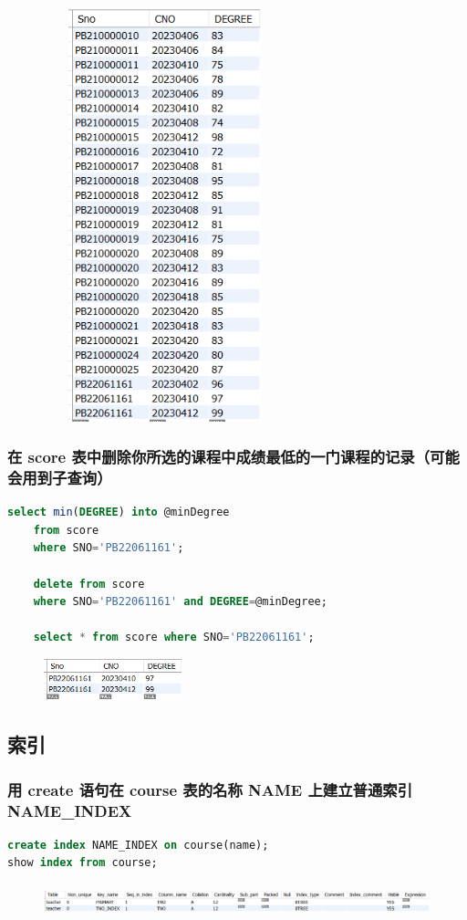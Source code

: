 \documentclass{ctexart}
\begin{document}
	\begin{figure}[H]
		\centering 
		\includegraphics[height=12cm,width=7cm]{17.png}
		\end{figure}
\subsubsection{在 score 表中删除你所选的课程中成绩最低的一门课程的记录（可能会用到子查询）}
\begin{lstlisting}[language=sql]
	select min(DEGREE) into @minDegree    
	from score    
	where SNO='PB22061161';  
	  
	delete from score    
	where SNO='PB22061161' and DEGREE=@minDegree;  
	  
	select * from score where SNO='PB22061161';	
\end{lstlisting}
\begin{figure}[H]
	\centering 
	\includegraphics[height=1.2cm,width=4cm]{18.png}
	\end{figure}
\subsection{索引}
\subsubsection{用 create 语句在 course 表的名称 NAME 上建立普通索引 NAME\_INDEX}
\begin{lstlisting}[language=sql]
create index NAME_INDEX on course(name);
show index from course;
\end{lstlisting}
\begin{figure}[H]
	\centering 
	\includegraphics[height=1cm,width=16cm]{19.png}
	\end{figure}
\end{document}
